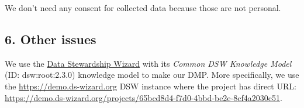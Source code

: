 \documentclass[
  english,
]{article}
\begin{document}
We don't need any consent for collected data because those are not
personal.

\hypertarget{sec-other-issues}{}
\hypertarget{other-issues}{%
\subsection{6. Other issues}\label{other-issues}}

\hypertarget{q-other-issues}{}
We use the \href{https://ds-wizard.org}{Data Stewardship Wizard} with
its \emph{Common DSW Knowledge Model} (ID: {{dsw}:{root}:{2.3.0}})
knowledge model to make our DMP. More specifically, we use the
\url{https://demo.ds-wizard.org} DSW instance where the project has
direct URL:
\url{https://demo.ds-wizard.org/projects/65bcd8d4-f7d0-4bbd-be2e-8cf4a2030c51}.
\end{document}
